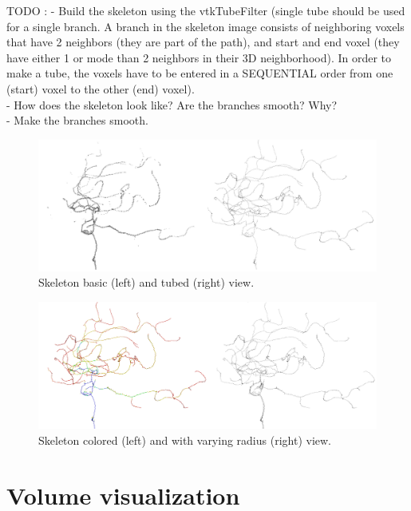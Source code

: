 TODO : -	Build the skeleton using the vtkTubeFilter (single tube should be used for a single branch. A branch in the skeleton image consists of neighboring voxels that have 2 neighbors (they are part of the path), and start and end voxel (they have either 1 or mode than 2 neighbors in their 3D neighborhood). In order to make a tube, the voxels have to be entered in a SEQUENTIAL order from one (start) voxel to the other (end) voxel).\\
-	How does the skeleton look like? Are the branches smooth? Why?\\
-	Make the branches smooth.\\

\begin{figure}
	\centering
	\includegraphics[scale=0.4]{fig/skeleton-basic-tubed}
	\caption{Skeleton basic (left) and tubed (right) view.}
	\label{fig:skeleton-basic-tubed}
\end{figure}

\begin{figure}
	\centering
	\includegraphics[scale=0.4]{fig/skeleton-colored-radius}
	\caption{Skeleton colored (left) and with varying radius (right) view.}
	\label{fig:skeleton-colored-radius}
\end{figure}

\section{Volume visualization}

